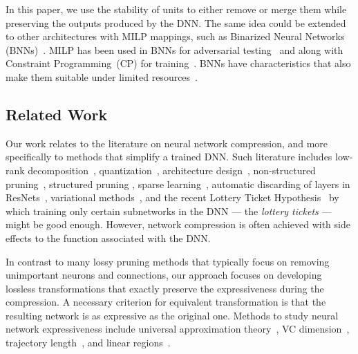 \documentclass[runningheads]{llncs}
\begin{document}
        In this paper, we use the stability of units to either remove or merge them while preserving the outputs produced by the DNN.
The same idea could be extended 
        to other architectures with MILP mappings, such as Binarized Neural Networks (BNNs)~\cite{courbariaux2016binarized,BinarizedProperties}. MILP has been used in BNNs for adversarial testing~\cite{BinarizedAttack} and along with Constraint Programming~(CP) for training~\cite{BinarizedTraining}. BNNs have characteristics that also make them suitable 
under limited  
        resources~\cite{BinarizedProperties}.
        
        
\subsection{Related Work}
Our work relates to the literature on neural network compression, and more specifically to methods that simplify a trained DNN. Such literature includes 
        low-rank decomposition~\cite{denton2014exploiting,jaderberg2014speeding,zhang2015efficient,wang2018wide,peng2018extreme,dubey2018coreset}, quantization~\cite{rastegari2016xnor,courbariaux2016binarized,wu2016quantized,tung2018clip}, architecture design~\cite{Szegedy2015,iandola2016squeezenet,howard2017mobilenets,huang2017densely,tang2019towards}, non-structured pruning~\cite{lin2018synaptic}, structured pruning \cite{han2015learning,li2016pruning,molchanov2016pruning,han2016dsd,luo2017thinet,aghasi2017net,yu2018nisp}, sparse learning~\cite{liu2015sparse,zhou2016less,alvarez2016learning,wen2016learning}, automatic discarding of layers in ResNets~\cite{Veit2017,yu2018learning,Herrmann2018}, variational methods~\cite{zhao2019variational}, and the recent Lottery Ticket Hypothesis~\cite{LotteryTicket} by which training only certain subnetworks in the DNN --- the \emph{lottery tickets} --- might be good enough. 
        However, network compression is often achieved with side effects to the function associated with the DNN. 
        
        In contrast to many lossy pruning methods that typically focus on removing unimportant neurons and connections, our approach focuses on developing lossless transformations that exactly preserve the expressiveness during the compression. A necessary criterion for equivalent transformation is that the resulting network is as expressive as the original one. Methods to study neural network expressiveness include universal approximation theory~\cite{Cybenko1989}, VC dimension~\cite{Bartlett1998}, trajectory length~\cite{raghu2017expressive}, and linear regions~\cite{pascanu2013on,montufar2014on,montufar2017notes,raghu2017expressive,arora2018understanding,serra2018bounding,hanin2019complexity,hanin2019deep,serra2020empirical}.
        
\end{document}

